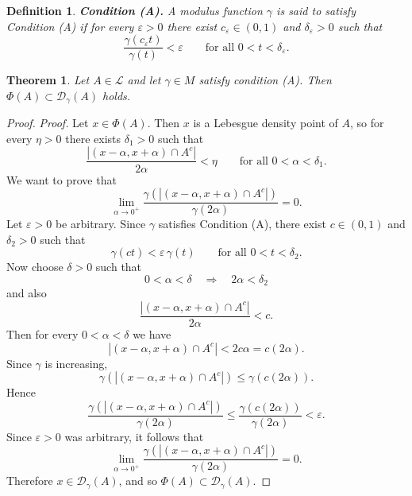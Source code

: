 \documentclass{amsart}
\newtheorem{theorem}{Theorem}
\theoremstyle{plain}
\newtheorem{definition}{Definition}
\numberwithin{equation}{section}
\begin{document}
\begin{definition}
 \textbf{Condition (A).}
A modulus function $\gamma$ is said to satisfy Condition (A) if for every $\varepsilon>0$
there exist $c_\varepsilon\in(0,1)$ and $\delta_\varepsilon>0$ such that
$$ \frac{\gamma(c_\varepsilon t)}{\gamma(t)}<\varepsilon
\qquad\text{for all }0<t<\delta_\varepsilon. $$

\end{definition}
\begin{theorem}\label{thm3}
Let $A\in \mathcal{L}$ and let $\gamma\in M$ satisfy condition (A). Then  $\Phi(A)\subset\mathcal{D}_\gamma(A)$ holds.
\end{theorem}
\begin{proof}
\textit{Proof.}
Let $x\in \Phi(A)$. Then $x$ is a Lebesgue density point of $A$, so for every $\eta>0$
there exists $\delta_1>0$ such that
$$\frac{|(x-\alpha,x+\alpha)\cap A^c|}{2\alpha}<\eta
\qquad\text{for all }0<\alpha<\delta_1.$$
We want to prove that
$$\lim_{\alpha\to 0^+}
\frac{\gamma(|(x-\alpha,x+\alpha)\cap A^c|)}{\gamma(2\alpha)}=0.$$
Let $\varepsilon>0$ be arbitrary. Since $\gamma$ satisfies Condition (A), there exist
$c\in(0,1)$ and $\delta_2>0$ such that
$$\gamma(ct)<\varepsilon\,\gamma(t) \qquad\text{for all }0<t<\delta_2.$$
Now choose $\delta>0$ such that
$$ 0<\alpha<\delta \quad\Longrightarrow\quad 2\alpha<\delta_2$$
and also
$$\frac{|(x-\alpha,x+\alpha)\cap A^c|}{2\alpha}<c.$$
Then for every $0<\alpha<\delta$ we have
$$|(x-\alpha,x+\alpha)\cap A^c|<2c\alpha=c(2\alpha).$$
Since $\gamma$ is increasing,
$$\gamma(|(x-\alpha,x+\alpha)\cap A^c|) \le \gamma(c(2\alpha)).$$
Hence $$\frac{\gamma(|(x-\alpha,x+\alpha)\cap A^c|)}{\gamma(2\alpha)} \le \frac{\gamma(c(2\alpha))}{\gamma(2\alpha)}
<\varepsilon.$$
Since $\varepsilon>0$ was arbitrary, it follows that
$$\lim_{\alpha\to 0^+} \frac{\gamma(|(x-\alpha,x+\alpha)\cap A^c|)}{\gamma(2\alpha)}=0.$$
Therefore $x\in \mathcal{D}_\gamma(A)$, and so $\Phi(A)\subset \mathcal{D}_\gamma(A)$.

\end{proof}
\end{document}
